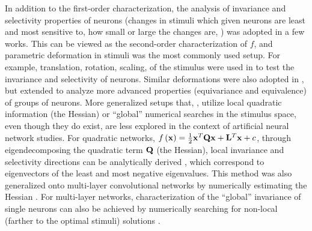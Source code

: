 \documentclass[10pt,twocolumn,letterpaper]{article}
\begin{document}
In addition to the first-order characterization, the analysis of invariance and selectivity properties of neurons (\eg changes in stimuli which given neurons are least and most sensitive to, how small or large the changes are, \etc) was adopted in a few works. This can be viewed as the second-order characterization of $f$, and parametric deformation in stimuli was the most commonly used setup.
For example, translation, rotation, scaling, \etc of the stimulus were used in \cite{goodfellow2009measuring, zeiler2014visualizing} to test the invariance and selectivity of neurons.
Similar deformations were also adopted in \cite{lenc2014understanding}, but extended to analyze more advanced properties (\ie equivariance and equivalence) of groups of neurons.
More generalized setups that, \eg, utilize local quadratic information (\ie the Hessian) or ``global'' numerical searches in the stimulus space, even though they do exist, are less explored in the context of artificial neural network studies.
For quadratic networks, \ie $f\left({\bf{x}}\right) = \frac{1}{2}{\bf{x}}^{T}{\bf{Qx}}+{\bf{L}}^{T}{\bf{x}}+c$, through eigendecomposing the quadratic term $\bf{Q}$ (\ie the Hessian), local invariance and selectivity directions can be analytically derived \cite{berkes2006analysis}, which correspond to eigenvectors of the least and most negative eigenvalues.
This method was also generalized onto multi-layer convolutional networks by numerically estimating the Hessian \cite{ngiam2010tiled}.
For multi-layer networks, characterization of the ``global'' invariance of single neurons can also be achieved by numerically searching for non-local (\ie farther to the optimal stimuli) solutions \cite{erhan2010understanding}.


\end{document}
